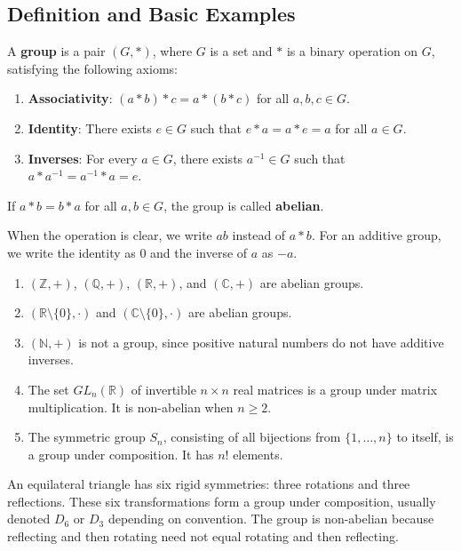 \subsection{Definition and Basic Examples}

\begin{definition}[Group]
A \textbf{group} is a pair $(G,*)$, where $G$ is a set and $*$ is a binary operation on $G$, satisfying the following axioms:
\begin{enumerate}
    \item \textbf{Associativity}: $(a*b)*c=a*(b*c)$ for all $a,b,c\in G$.
    \item \textbf{Identity}: There exists $e\in G$ such that $e*a=a*e=a$ for all $a\in G$.
    \item \textbf{Inverses}: For every $a\in G$, there exists $a^{-1}\in G$ such that $a*a^{-1}=a^{-1}*a=e$.
\end{enumerate}
If $a*b=b*a$ for all $a,b\in G$, the group is called \textbf{abelian}.
\end{definition}

When the operation is clear, we write $ab$ instead of $a*b$. For an additive group, we write the identity as $0$ and the inverse of $a$ as $-a$.

\begin{example}
\begin{enumerate}
    \item $(\mathbb{Z},+)$, $(\mathbb{Q},+)$, $(\mathbb{R},+)$, and $(\mathbb{C},+)$ are abelian groups.
    \item $(\mathbb{R}\setminus\{0\},\cdot)$ and $(\mathbb{C}\setminus\{0\},\cdot)$ are abelian groups.
    \item $(\mathbb{N},+)$ is not a group, since positive natural numbers do not have additive inverses.
    \item The set $GL_n(\mathbb{R})$ of invertible $n\times n$ real matrices is a group under matrix multiplication. It is non-abelian when $n\geq 2$.
    \item The symmetric group $S_n$, consisting of all bijections from $\{1,\dots,n\}$ to itself, is a group under composition. It has $n!$ elements.
\end{enumerate}
\end{example}

\begin{example}
An equilateral triangle has six rigid symmetries: three rotations and three reflections. These six transformations form a group under composition, usually denoted $D_6$ or $D_3$ depending on convention. The group is non-abelian because reflecting and then rotating need not equal rotating and then reflecting.
\end{example}


